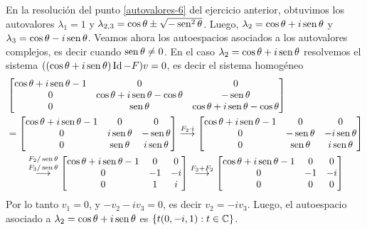 \begin{enumerate}[topsep=6pt,itemsep=.4cm]
    En la resolución del punto \ref{autovalores-6} del ejercicio anterior, obtuvimos los autovalores $\lambda_1 = 1$ y $\lambda_{2,3} = \cos\theta\pm\sqrt{-\operatorname{sen}^2\theta}$. Luego, $\lambda_2 =\cos\theta + i\operatorname{sen}\theta$ y $\lambda_3 =\cos\theta - i\operatorname{sen}\theta$. Veamos ahora  los autoespacios asociados a los autovalores complejos, es decir cuando $\operatorname{sen}\theta \ne 0$. En  el caso $\lambda_2 =\cos\theta + i\operatorname{sen}\theta$ resolvemos el sistema  $((\cos\theta + i\operatorname{sen}\theta)\operatorname{Id}-F)v=0$, es decir el sistema homogéneo
    \begin{align*}
        &\begin{bmatrix} \cos\theta + i\operatorname{sen}\theta-1 & 0 & 0\\ 0 & \cos\theta + i\operatorname{sen}\theta-\cos\theta & -\operatorname{sen}\theta\\ 0 & \operatorname{sen}\theta & \cos\theta + i\operatorname{sen}\theta-\cos\theta \end{bmatrix} \\
        &= \begin{bmatrix} \cos\theta + i\operatorname{sen}\theta-1 & 0 & 0\\ 0 & i\operatorname{sen}\theta & -\operatorname{sen}\theta\\ 0 & \operatorname{sen}\theta & i\operatorname{sen}\theta \end{bmatrix} \stackrel{F_2\cdot i}{\longrightarrow} \begin{bmatrix} \cos\theta + i\operatorname{sen}\theta-1 & 0 & 0\\ 0 &  -\operatorname{sen}\theta & -i\operatorname{sen}\theta\\ 0 & \operatorname{sen}\theta & i\operatorname{sen}\theta \end{bmatrix} \\
        &\qquad\overset{F_2/\operatorname{sen}\theta}{\stackrel{F_3/\operatorname{sen}\theta}{\longrightarrow}} \begin{bmatrix} \cos\theta + i\operatorname{sen}\theta-1 & 0 & 0\\ 0 & -1 & -i\\ 0 & 1 & i \end{bmatrix} \stackrel{F_3+F_2}{\longrightarrow}\begin{bmatrix} \cos\theta + i\operatorname{sen}\theta-1 & 0 & 0\\ 0 & -1 & -i\\ 0 & 0 & 0 \end{bmatrix}
    \end{align*}
    Por lo tanto $v_1 = 0$, y $-v_2-iv_3=0$, es decir $v_2 = -iv_3$. Luego, el autoespacio asociado a $\lambda_2 =\cos\theta + i\operatorname{sen}\theta$ es $\{t(0,-i,1): t \in \mathbb C\}$.


\end{enumerate}
